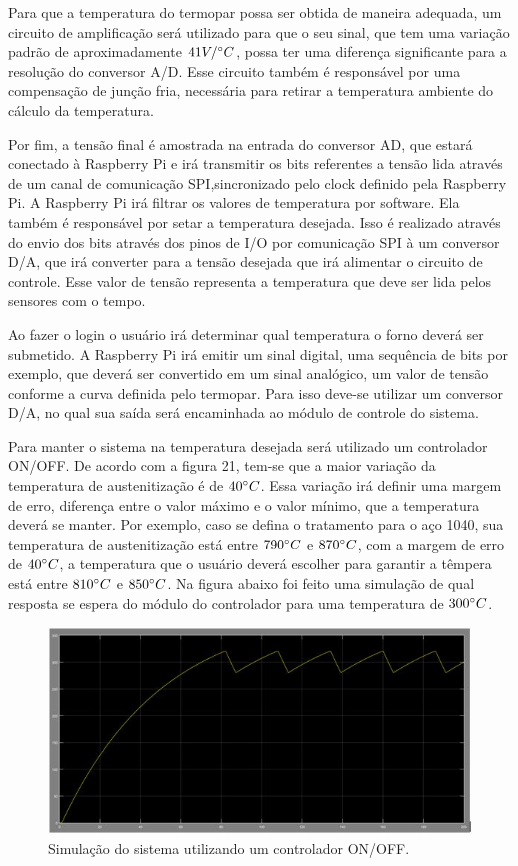 Para que a temperatura do termopar possa ser obtida de maneira adequada, um circuito de amplificação será utilizado para que o seu sinal, que tem uma variação padrão de aproximadamente $41 V/ \degree C$, possa ter uma diferença significante para a resolução do conversor A/D. Esse circuito também é responsável por uma compensação de junção fria, necessária para retirar a temperatura ambiente do cálculo da temperatura.

Por fim, a tensão final é amostrada na entrada do conversor AD, que estará conectado à Raspberry Pi e irá transmitir os bits referentes a tensão lida através de um canal de comunicação SPI,sincronizado pelo clock definido pela Raspberry Pi. A Raspberry Pi irá filtrar os valores de temperatura por software. Ela também é responsável por setar a temperatura desejada. Isso é realizado através do envio dos bits através dos pinos de I/O por comunicação SPI à um conversor D/A, que irá converter para a tensão desejada que irá alimentar o circuito de controle. Esse valor de tensão representa a temperatura que deve ser lida pelos sensores com o tempo.

Ao fazer o login o usuário irá determinar qual temperatura o forno deverá ser submetido. A Raspberry Pi irá emitir um sinal digital, uma sequência de bits por exemplo, que deverá ser convertido em um sinal analógico, um valor de tensão conforme a curva definida pelo termopar. Para isso deve-se utilizar um conversor D/A, no qual sua saída será encaminhada ao módulo de controle do sistema.

Para manter o sistema na temperatura desejada será utilizado um controlador ON/OFF\@. De acordo com a figura 21, tem-se que a maior variação da temperatura de austenitização é de $40 \degree C$. Essa variação irá definir uma margem de erro, diferença entre o valor máximo e o valor mínimo, que a temperatura deverá se manter. Por exemplo, caso se defina o tratamento para o aço 1040, sua temperatura de austenitização está entre $790 \degree C$ e $870 \degree C$, com a margem de erro de $40 \degree C$, a temperatura que o usuário deverá escolher para garantir a têmpera está entre $810 \degree C$ e $850 \degree C$. Na figura abaixo foi feito uma simulação de qual resposta se espera do módulo do controlador para uma temperatura de $300 \degree C$.


\begin{figure}[h]
	\centering
	\label{on_off}
	\includegraphics[keepaspectratio=true,scale=0.8]{figuras/on_off.JPG}
	\caption{Simulação do sistema utilizando um controlador ON/OFF.}
\end{figure}

